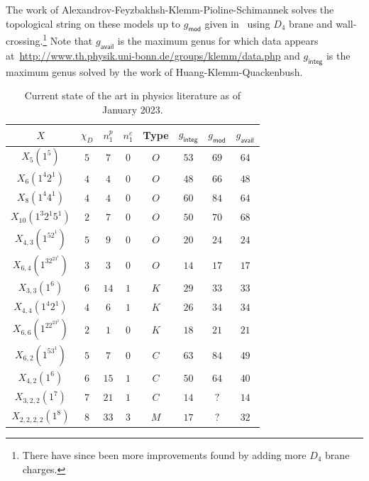 \documentclass[10pt]{amsart}
\theoremstyle{definition}
\theoremstyle{remark}
\theoremstyle{plain}
\theoremstyle{definition}
\theoremstyle{remark}
\newcommand{\ms}[1]{\mathsf{#1}}
\newcommand{\1}{\mathbf{1}}
\newcommand{\2}{\mathbf{2}}
\newcommand{\3}{\mathbf{3}}
\begin{document}
The work of Alexandrov-Feyzbakhsh-Klemm-Pioline-Schimannek solves the topological string on these models up to $g_{\ms{mod}}$ given in~ using $D_4$ brane and wall-crossing.\footnote{There have since been more improvements found by adding more $D_4$ brane charges.} Note that $g_{\ms{avail}}$ is the maximum genus for which data appears at~\url{http://www.th.physik.uni-bonn.de/groups/klemm/data.php} and $g_{\ms{integ}}$ is the maximum genus solved by the work of Huang-Klemm-Quackenbush. 
\begin{table}[htpb]
    \centering
    \caption{Current state of the art in physics literature as of January 2023.}
    \label{tab:stateofart}
    \begin{tabular}{cccccccc}
        \toprule
        $X$                   & $\chi_D$ & $n_1^p$ & $n_1^c$ & Type & $g_{\ms{integ}}$ & $g_{\ms{mod}}$ & $g_{\ms{avail}}$ \\
        \midrule
        $X_5(1^5)$            & $5$ & $7$ & $0$ & $O$ & $53$ & $69$ & $64$ \\
        $X_6(1^4 2^1)$        & $4$ & $4$ & $0$ & $O$ & $48$ & $66$ & $48$ \\
        $X_8(1^4 4^1)$        & $4$ & $4$ & $0$ & $O$ & $60$ & $84$ & $64$ \\
        $X_{10}(1^3 2^1 5^1)$ & $2$ & $7$ & $0$ & $O$ & $50$ & $70$ & $68$ \\
        $X_{4,3}(1^52^1)$     & $5$ & $9$ & $0$ & $O$ & $20$ & $24$ & $24$ \\
        $X_{6,4}(1^32^23^1)$  & $3$ & $3$ & $0$ & $O$ & $14$ & $17$ & $17$ \\
        $X_{3,3}(1^6)$        & $6$ & $14$ & $1$ & $K$ & $29$ & $33$ & $33$ \\
        $X_{4,4}(1^4 2^1)$    & $4$ & $6$ & $1$ & $K$ & $26$ & $34$ & $34$ \\
        $X_{6,6}(1^22^23^2)$  & $2$ & $1$ & $0$ & $K$ & $18$ & $21$ & $21$ \\
        $X_{6,2}(1^53^1)$     & $5$ & $7$ & $0$ & $C$ & $63$ & $84$ & $49$ \\
        $X_{4,2}(1^6)$        & $6$ & $15$ & $1$ & $C$ & $50$ & $64$ & $40$ \\
        $X_{3,2,2}(1^7)$      & $7$ & $21$ & $1$ & $C$ & $14$ & $?$ & $14$ \\
        $X_{2,2,2,2}(1^8)$    & $8$ & $33$ & $3$ & $M$ & $17$ & $?$ & $32$ \\
        \bottomrule
    \end{tabular}
\end{table}
\end{document}
